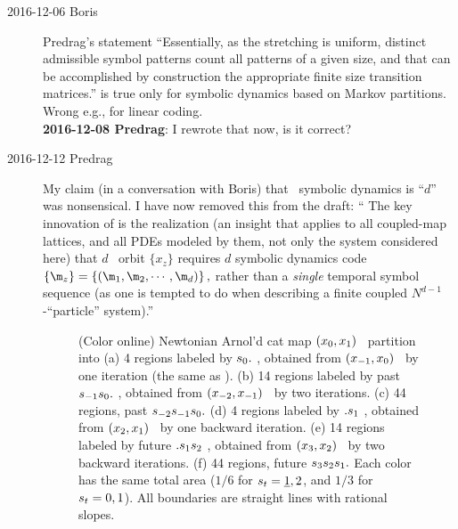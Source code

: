 \begin{description}
\item[2016-12-06 Boris] Predrag's statement
``Essentially, as the stretching is uniform, distinct admissible symbol
patterns count all patterns of a given size, and that can be accomplished by
construction the appropriate finite size transition matrices.''
is true only for symbolic dynamics based on Markov partitions. Wrong e.g.,
for linear coding.
\\
{\bf 2016-12-08 Predrag}: I rewrote that now, is it correct?

\item[2016-12-12 Predrag] My claim (in a conversation with Boris) that
\catlatt\ symbolic dynamics is ``$d$\dmn'' was nonsensical. I have now removed
this from the draft: ``
The key
innovation of  is the realization (an insight that applies
to all coupled-map lattices, and all PDEs modeled by them, not only the
system considered here) that $d$\dmn\ {\spt} orbit $\{x_{z}\}$
requires {\em $d$\dmn} symbolic dynamics code
\(
\{\m_{z}\} = \{(\m_{1},\m_{2},\cdots,\m_{d})\}
\,,
\)
rather than a \emph{single} temporal symbol sequence (as one is tempted to do
when describing a finite coupled $N^{d-1}$-``particle'' system).''

\begin{figure}
	\caption{\label{fig:SingleCat1color}
(Color online)
Newtonian Arnol'd cat map $(x_{0},x_{1})$  \statesp\ partition into
(a) 4 regions labeled by ${s_{0}}.$ , obtained from
$(x_{-1},x_{0})$ \statesp\ by one iteration (the same as
).
(b) 14 regions labeled by past {\brick} ${s_{-1}}{s_{0}}.$ , obtained from
$(x_{-2},x_{-1})$ \statesp\ by two iterations.
(c) 44 regions, past {\brick} ${s_{-2}}{s_{-1}}{s_{0}}.$
(d) 4 regions labeled by $.{s_{1}}$ , obtained from
$(x_{2},x_{1})$ \statesp\ by one backward iteration.
(e) 14 regions labeled by future {\brick} $.{s_{1}}{s_{2}}$ , obtained from
$(x_{3},x_{2})$ \statesp\ by two backward iterations.
(f) 44 regions, future {\brick} ${s_{3}}{s_{2}}{s_{1}}.$
Each color has the same total area ($1/6$ for ${s_{t}} = \underline{1},
2$, and $1/3$ for ${s_{t}} = 0, 1$). All boundaries are straight
lines with rational slopes.
	}
\end{figure}


\end{description}
